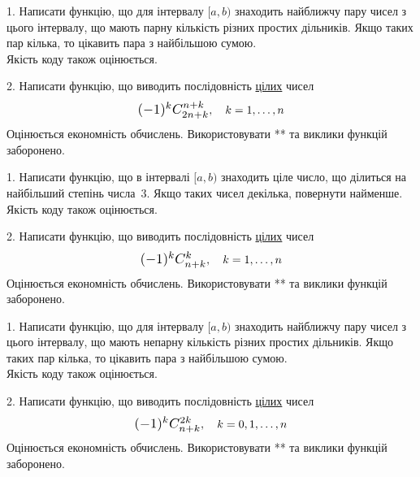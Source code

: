 \documentclass[12pt, ukrainian]{article}
\begin{document}



\begin {Large}
1. Написати функцію, що для інтервалу $[a, b)$ знаходить найближчу пару чисел з цього інтервалу, що мають парну кількість різних простих дільників. Якщо таких пар кілька, то цікавить пара з найбільшою сумою.\\	Якість коду також оцінюється. 



\vspace{10mm}

\newpage

2. 
Написати функцію, що виводить послідовність \underline{цілих} чисел
$$\scalebox{1.2}{$(-1)^{k}C_{2n+k}^{n+k}$}, \quad k=1,\ldots,n$$
Оцінюється економність обчислень. Використовувати ** та виклики функцій заборонено.

\end {Large}\newpage




\begin {Large}
1. Написати функцію, що в інтервалі $[a, b)$ знаходить ціле число, що ділиться на найбільший степінь числа 3. Якщо таких чисел декілька, повернути найменше.\\	Якість коду також оцінюється. 



\vspace{10mm}

\newpage

2. 
Написати функцію, що виводить послідовність \underline{цілих} чисел
$$\scalebox{1.2}{$(-1)^{k}C_{n+k}^{k}$}, \quad k=1,\ldots,n$$
Оцінюється економність обчислень. Використовувати ** та виклики функцій заборонено.

\end {Large}\newpage




\begin {Large}
1. Написати функцію, що для інтервалу $[a, b)$ знаходить найближчу пару чисел з цього інтервалу, що мають непарну кількість різних простих дільників. Якщо таких пар кілька, то цікавить пара з найбільшою сумою.\\	Якість коду також оцінюється. 



\vspace{10mm}

\newpage

2. 
Написати функцію, що виводить послідовність \underline{цілих} чисел
$$\scalebox{1.2}{$(-1)^{k}C_{n+k}^{2k}$}, \quad k=0,1,\ldots,n$$
Оцінюється економність обчислень. Використовувати ** та виклики функцій заборонено.

\end {Large}\newpage
\end{document}
